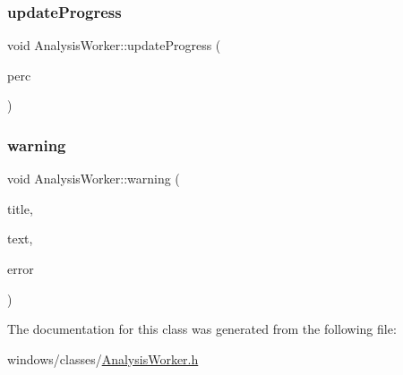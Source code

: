\subsubsection{\texorpdfstring{update\+Progress}{updateProgress}}
{\footnotesize\ttfamily void Analysis\+Worker\+::update\+Progress (\begin{DoxyParamCaption}\item[{qint64}]{perc }\end{DoxyParamCaption})\hspace{0.3cm}{\ttfamily [signal]}}

\mbox{\label{class_analysis_worker_a93420a620050e4d242ce4f26989790e8}} 
\subsubsection{\texorpdfstring{warning}{warning}}
{\footnotesize\ttfamily void Analysis\+Worker\+::warning (\begin{DoxyParamCaption}\item[{Q\+String}]{title,  }\item[{Q\+String}]{text,  }\item[{Q\+String}]{error }\end{DoxyParamCaption})\hspace{0.3cm}{\ttfamily [signal]}}



The documentation for this class was generated from the following file\+:\begin{DoxyCompactItemize}
\item 
windows/classes/\hyperlink{_analysis_worker_8h}{Analysis\+Worker.\+h}\end{DoxyCompactItemize}
